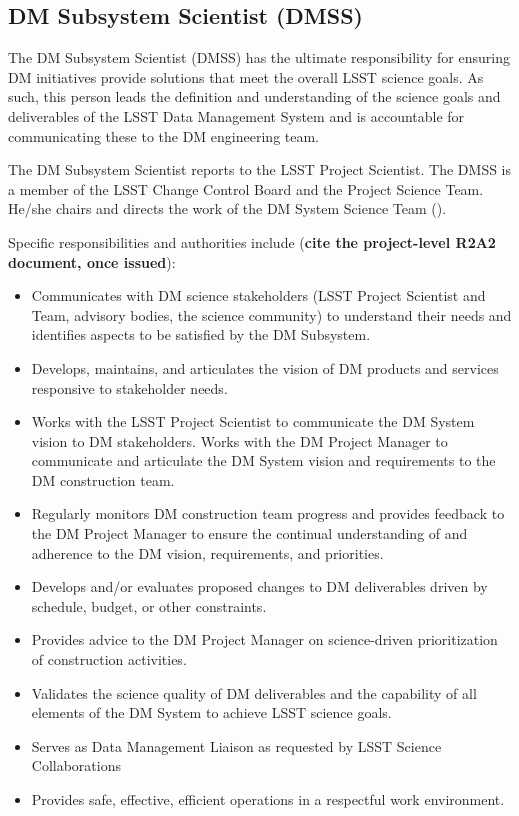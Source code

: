\subsection{DM Subsystem Scientist (DMSS) \label{role:dmps} }

The DM Subsystem Scientist (DMSS) has the ultimate responsibility for ensuring DM initiatives provide solutions that meet the overall LSST science goals. As such, this person leads the definition and understanding of the science goals and deliverables of the LSST Data Management System and is accountable for communicating these to the DM engineering team.

The DM Subsystem Scientist reports to the LSST Project Scientist. The DMSS is a member of the LSST Change Control Board and the Project Science Team. He/she chairs and directs the work of the DM System Science Team ().

Specific responsibilities and authorities include (\textbf{cite the project-level R2A2 document, once issued}):


\begin{itemize}
\item Communicates with DM science stakeholders (LSST Project Scientist and Team, advisory bodies, the science community) to understand their needs and identifies aspects to be satisfied by the DM Subsystem.
\item Develops, maintains, and articulates the vision of DM products and services responsive to stakeholder needs.
\item Works with the LSST Project Scientist to communicate the DM System vision to DM stakeholders. Works with the DM Project Manager to communicate and articulate the DM System vision and requirements to the DM construction team.
\item Regularly monitors DM construction team progress and provides feedback to the DM Project Manager to ensure the continual understanding of and adherence to the DM vision, requirements, and priorities.
\item Develops and/or evaluates proposed changes to DM deliverables driven by schedule, budget, or other constraints.
\item Provides advice to the DM Project Manager on science-driven prioritization of construction activities.
\item Validates the science quality of DM deliverables and the capability of all elements of the DM System to achieve LSST science goals.
\item Serves as Data Management Liaison as requested by LSST Science Collaborations
\item Provides safe, effective, efficient operations in a respectful work environment.
\end{itemize}

